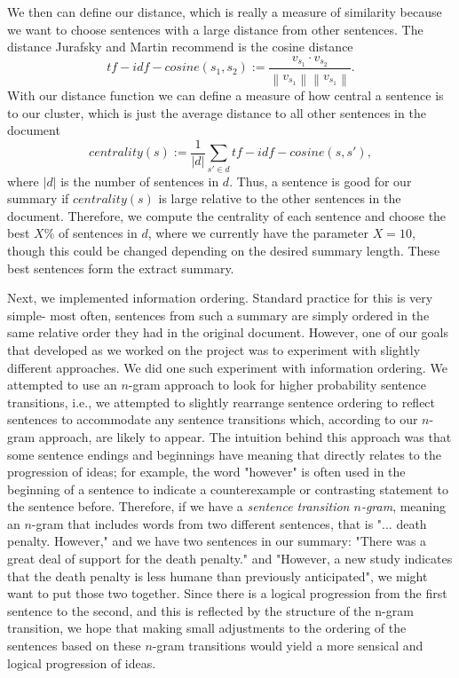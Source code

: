 \documentclass[12pt]{article}
\theoremstyle{plain}
\theoremstyle{definition}
\theoremstyle{remark}
\theoremstyle{plain}
\newcommand{\norm}[1]{\left\lVert #1 \right\rVert}
\begin{document}
We then can define our distance, which is really a measure of similarity because we want to choose sentences with a large distance from other sentences. The distance Jurafsky and Martin recommend is the cosine distance
$$tf-idf-cosine(s_1,s_2) := \frac{ v_{s_1} \cdot v_{s_2}}{\norm{v_{s_1}}\norm{v_{s_1}}}.$$
With our distance function we can define a measure of how central a sentence is to our cluster, which is just the average distance to all other sentences in the document
$$centrality(s) := \frac{1}{|d|}\sum_{s'\in d} tf-idf-cosine(s,s'),$$
where $|d|$ is the number of sentences in $d$. Thus, a sentence is good for our summary if $centrality(s)$ is large relative to the other sentences in the document. Therefore, we compute the centrality of each sentence and choose the best $X$\% of sentences in $d$, where we currently have the parameter $X=10$, though this could be changed depending on the desired summary length. These best sentences form the extract summary.


	Next, we implemented information ordering. Standard practice for this is very simple- most often, sentences from such a summary are simply ordered in the same relative order they had in the original document. However, one of our goals that developed as we worked on the project was to experiment with slightly different approaches. We did one such experiment with information ordering. We attempted to use an $n$-gram approach to look for higher probability sentence transitions, i.e., we attempted to slightly rearrange sentence ordering to reflect sentences to accommodate any sentence transitions which, according to our $n$-gram approach, are likely to appear. 
The intuition behind this approach was that some sentence endings and beginnings have meaning that directly relates to the progression of ideas; for example, the word "however" is often used in the beginning of a sentence to indicate a counterexample or contrasting statement to the sentence before. Therefore, if we have a \emph{sentence transition $n$-gram}, meaning an $n$-gram that includes words from two different sentences, that is "... death penalty. However," and we have two sentences in our summary: "There was a great deal of support for the death penalty." and "However, a new study indicates that the death penalty is less humane than previously anticipated", we might want to put those two together. Since there is a logical progression from the first sentence to the second, and this is reflected by the structure of the n-gram transition, we hope that making small adjustments to the ordering of the sentences based on these $n$-gram transitions would yield a more sensical and logical progression of ideas. 
\end{document}
